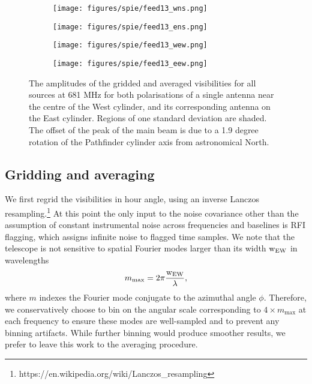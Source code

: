 \begin{figure}[h!] %
	\centering
	\begin{subfigure}[b]{0.49\textwidth}%
		\texttt{[image: figures/spie/feed13\_wns.png]}%
	\end{subfigure}%
	\begin{subfigure}[b]{0.47\textwidth}
		\texttt{[image: figures/spie/feed13\_ens.png]}%
	\end{subfigure}
	\begin{subfigure}[b]{0.4925\textwidth}
		\texttt{[image: figures/spie/feed13\_wew.png]}%
	\end{subfigure}
	\begin{subfigure}[b]{0.4675\textwidth}
		\texttt{[image: figures/spie/feed13\_eew.png]}%
	\end{subfigure}
\caption{The amplitudes of the gridded and averaged visibilities for all sources at 681 MHz for both polarisations of a single antenna near the centre of the West cylinder, and its corresponding antenna on the East cylinder. Regions of one standard deviation are shaded. The offset of the peak of the main beam is due to a 1.9 degree rotation of the Pathfinder cylinder axis from astronomical North.}
\vspace{-.1in}
\label{griddeddata}
\end{figure}

\subsection{Gridding and averaging}
We first regrid the visibilities in hour angle, using an inverse Lanczos resampling.\footnote{https://en.wikipedia.org/wiki/Lanczos\_resampling} At this point the only input to the noise covariance other than the assumption of constant instrumental noise across frequencies and baselines is RFI flagging, which assigns infinite noise to flagged time samples. We note that the telescope is not sensitive to spatial Fourier modes larger than its width ${\rm w_{EW}}$ in wavelengths
\begin{equation}
m_{\rm max} = 2\pi \frac{\rm w_{EW}}{\lambda},
\end{equation}
where $m$ indexes the Fourier mode conjugate to the azimuthal angle $\phi$. Therefore, we conservatively choose to bin on the angular scale corresponding to $4\times m_{\max}$ at each frequency to ensure these modes are well-sampled and to prevent any binning artifacts. While further binning would produce smoother results, we prefer to leave this work to the averaging procedure. 

